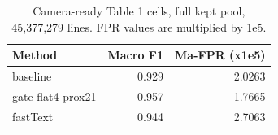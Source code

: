 \begin{table}[htbp]
\centering
\small
\begin{tabular}{lrr}
\toprule
\textbf{Method} & \textbf{Macro F1} & \textbf{Ma-FPR (x1e5)} \\
\midrule
baseline & 0.929 & 2.0263 \\
gate-flat4-prox21 & 0.957 & 1.7665 \\
fastText & 0.944 & 2.7063 \\
\bottomrule
\end{tabular}
\caption{Camera-ready Table 1 cells, full kept pool, 45,377,279 lines. FPR values are multiplied by 1e5.}
\label{tab:paper_eval_table1}
\end{table}
